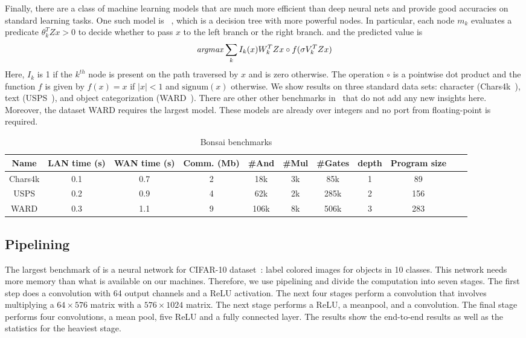 Finally, there are a class of machine learning models that are much more efficient than
deep neural nets and provide good accuracies on standard learning tasks. One such model
is \bonsai~\cite{bonsai}, which is a decision tree with more powerful nodes.
In particular, each node $m_k$ evaluates a predicate $\theta_k^TZx > 0$ to decide whether
to pass $x$ to the left branch or the right branch. and the predicted value is
\[
{\it argmax} \sum_k I_k(x)W_k^TZx\circ f(\sigma V_k^TZx) 
\]
Here, $I_k$ is 1 if the $k^{th}$ node is present on the path traversed by $x$
and is zero otherwise. 
The operation $\circ$ is a pointwise dot product and
the function $f$ is given by $f(x) = x$ if $|x| < 1$ and $\mathrm{signum}(x)$ otherwise.
We show results on three standard data sets: character  (Chars4k~\cite{campos}), text (USPS~\cite{hull}), and object categorization (WARD~\cite{yang}). There are other other benchmarks in~\cite{bonsai} that do not add any new insights here. Moreover, the dataset WARD requires the largest model. These models are already over integers and no port from floating-point is required.


\begin{table*}
\begin{tabular}{c|c|c|c |c|c|c|c|c|c | c}
Name       & LAN time (s) & WAN time (s) & Comm. (Mb)  & \#And & \#Mul & \#Gates & depth & Program size\\
\hline
Chars4k    &  0.1         & 0.7         & 2            & 18k    & 3k    &  85k     & 1   & 89\\
\hline
USPS       &  0.2         & 0.9         & 4            & 62k    & 2k    &  285k    & 2   & 156\\
\hline
WARD       &  0.3         & 1.1         & 9            & 106k    & 8k    &  506k    & 3   & 283\\
\hline
\end{tabular}

 \caption{Bonsai benchmarks}
 \label{tab:lcd} 
\end{table*}

\subsection{Pipelining}
The largest benchmark of \minion is a neural network for CIFAR-10 dataset~\cite{cifar}: label colored images for objects in 10 classes. This network needs more memory than what is available
on our machines. Therefore, we use pipelining and divide the computation into seven stages.
The first step does a convolution with 64 output channels and a ReLU activation.
The next four stages perform a convolution that involves multiplying a $64\times 576$ matrix with a
$576\times 1024$ matrix. The next stage performs a ReLU, a meanpool, and a convolution.
The final stage performs four convolutions, a mean pool, five ReLU and a fully connected layer.
The results show the end-to-end results as well as the statistics for the heaviest stage.

